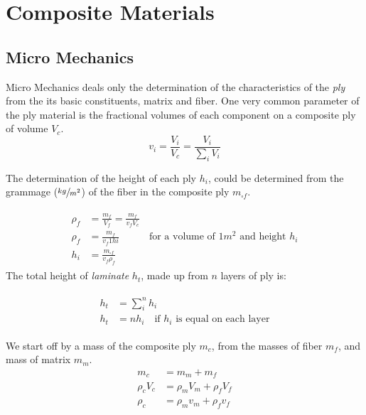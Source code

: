 \chapter{Composite Materials}

\section{Micro Mechanics}
Micro Mechanics deals only the determination of the characteristics of the \emph{ply} from the its basic constituents, matrix and fiber.
One very common parameter of the ply material is the fractional volumes of each component on a composite ply of volume $V_c$.
\begin{equation}
v_i=\frac{V_i}{V_c}=\frac{V_i}{\sum\limits_{i} V_i}
\end{equation}

The determination of the height of each ply $h_i$, could be determined from the grammage ($\sfrac{kg}{m^2}$) of the fiber in the composite ply $m_{\square f}$.

\begin{gather}
\begin{align}
\rho_f &= \frac{m_f}{V_f}=\frac{m_f}{v_f V_c} \nonumber \\
\rho_f &= \frac{m_f}{v_f 1 hi} \qquad \quad  \text{for a volume of $1m^2$ and height $h_i$}\nonumber\\[1mm]
h_i &= \frac{m_{\square f}}{v_f \rho_f}
\end{align}
\end{gather}
The total height of \emph{laminate} $h_t$, made up from $n$ layers of ply is:

\begin{gather}
\begin{align}
h_t&=\sum\limits_{i}^{n}h_i\\
h_t&=nh_i \quad \text{if $h_i$ is equal on each layer}
\end{align}
\end{gather}

We start off by a mass of the composite ply $m_c$, from the masses of fiber $m_f$, and mass of matrix $m_m$.
\begin{subequations}
\begin{align}
m_{c}&=m_{m}+m_{f} \\
\rho_c V_c&= \rho_m V_m + \rho_f V_f \nonumber \\
\rho_c & = \rho_m v_m + \rho_f v_f \label{mixture_law}
\end{align}
\end{subequations}

